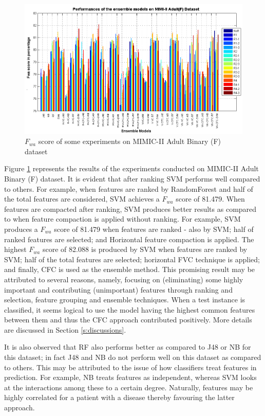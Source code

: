\begin{figure}[h] 
	\centering
	\includegraphics[scale=0.6]{fig/mimic2-adultk1f-full-table.png}
	\caption{$F_{wa}$ score of some experiments on MIMIC-II Adult Binary (F) dataset}
	\label{F:MIMIC2_AdultK1F_Table}
\end{figure}

Figure \ref{F:MIMIC2_AdultK1F_Table} represents the results of the experiments conducted on MIMIC-II Adult Binary (F) dataset. It is evident that after ranking SVM performs well compared to others. For example, when features are ranked by RandomForest and half of the total features are considered, SVM achieves a $F_{wa}$ score of 81.479. When features are compacted after ranking, SVM produces better results as compared to when feature compaction is applied without ranking. For example, SVM produces a $F_{wa}$ score of 81.479 when features are ranked - also by SVM; half of ranked features are selected; and Horizontal feature compaction is applied. The highest $F_{wa}$ score of 82.088 is produced by SVM when features are ranked by SVM; half of the total features are selected; horizontal FVC technique is applied; and finally, CFC is used as the ensemble method. This promising result may be attributed to several reasons, namely, focusing on (eliminating) some highly important and contributing (unimportant) features through ranking and selection, feature grouping and ensemble techniques. When a test instance is classified, it seems logical to use the model having the highest common features between them and thus the CFC approach contributed positively. More details are discussed in Section \ref{s:discussions}. 
 
It is also observed that RF also performs better as compared to J48 or NB for this dataset; in fact J48 and NB do not perform well on this dataset as compared to others. This may be attributed to the issue of how classifiers treat features in prediction. For example, NB treats features as independent, whereas SVM looks at the interactions among these to a certain degree. Naturally, features may be highly correlated for a patient with a disease thereby favouring the latter approach.   

